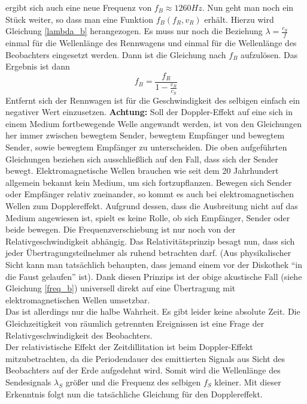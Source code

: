 ergibt sich auch eine neue Frequenz von \begin{math}{f_B \approx 1260 Hz} \end{math}. Nun geht man noch ein Stück weiter, so dass man eine Funktion 
\begin{math}{f_B(f_R,v_R)} \end{math} erhält. Hierzu wird Gleichung \ref{lambda_b} herangezogen. Es muss nur noch die Beziehung \begin{math}{\lambda=\frac{c_S}{f}} \end{math} 
einmal für die Wellenlänge des Rennwagens und einmal für die Wellenlänge des Beobachters eingesetzt werden. Dann ist die Gleichung nach \begin{math}{f_B} \end{math} aufzulösen.  
Das Ergebnis ist dann         
\begin{equation}
\label{freq_b}
f_B=\frac{f_R}{1-\frac{v_R}{c_S}}
\end{equation}
Entfernt sich der Rennwagen ist für die Geschwindigkeit des selbigen einfach ein negativer Wert einzusetzen. \textbf{Achtung:} Soll der Doppler-Effekt auf eine sich in einem Medium fortbewegende
Welle angewandt werden, ist von den Gleichungen her immer zwischen bewegtem Sender, bewegtem Empfänger und bewegtem Sender, sowie bewegtem Empfänger zu unterscheiden. 
Die oben aufgeführten Gleichungen beziehen sich ausschließlich auf den Fall, dass sich der Sender bewegt. 
\newpar
Elektromagnetische Wellen brauchen wie seit dem 20 Jahrhundert allgemein bekannt kein Medium, um sich fortzupflanzen. Bewegen sich Sender oder Empfänger relativ zueinander, so kommt es auch bei elektromagnetischen Wellen zum Dopplereffekt. Aufgrund dessen, dass die Ausbreitung nicht auf das Medium angewiesen ist, spielt es keine Rolle, ob sich Empfänger, Sender oder beide bewegen. Die Frequenzverschiebung ist nur noch von der Relativgeschwindigkeit abhängig. Das Relativitätsprinzip besagt nun, dass sich jeder Übertragungsteilnehmer als ruhend betrachten darf. (Aus physikalischer Sicht kann man tatsächlich behaupten, dass jemand einem vor der Diskothek "`in die Faust gelaufen"' ist). Dank diesen Prinzips ist der obige akustische Fall (siehe Gleichung \ref{freq_b}) universell direkt auf eine Übertragung mit elektromagnetischen Wellen umsetzbar. 
\\Das ist allerdings nur die halbe Wahrheit. Es gibt leider keine absolute Zeit. Die Gleichzeitigkeit von räumlich getrennten Ereignissen ist eine Frage der Relativgeschwindigkeit des Beobachters. 
\\Der relativistische Effekt der Zeitdillitation ist beim Doppler-Effekt mitzubetrachten, da die Periodendauer des emittierten Signals aus Sicht des Beobachters auf der Erde aufgedehnt wird. Somit wird die Wellenlänge des Sendesignals \begin{math}{\lambda_S}\end{math} größer und die Frequenz des selbigen \begin{math}{f_S}\end{math} kleiner. Mit dieser Erkenntnis folgt nun die tatsächliche Gleichung für den Dopplereffekt.  
